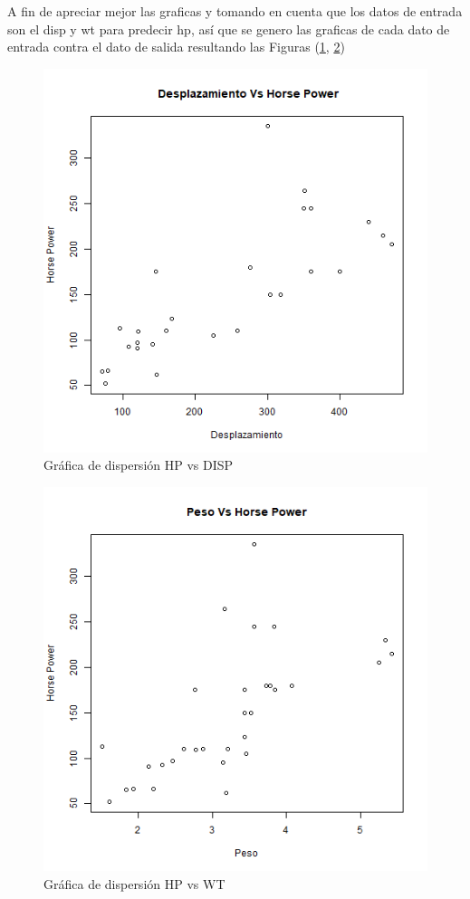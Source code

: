\documentclass[sigconf]{acmart}
\begin{document}
	A fin de apreciar mejor las graficas y tomando en cuenta que los datos de entrada son el disp y wt para predecir hp, así que se genero las graficas de cada dato de entrada contra el dato de salida resultando las Figuras (\ref{fig:carsD2A}, \ref{fig:carsD2B})
	
	\begin{figure}
		\centering
		\includegraphics[width=0.7\linewidth]{img/dispersionCarrosHPVSDISP.png}
		\caption{Gráfica de dispersión HP vs DISP}
		\label{fig:carsD2A}
	\end{figure}
	
	\begin{figure}
		\centering
		\includegraphics[width=0.7\linewidth]{img/dispersionCarrosHPVSWT.png}
		\caption{ Gráfica de dispersión HP vs WT}
		\label{fig:carsD2B}
	\end{figure}
	
\end{document}
